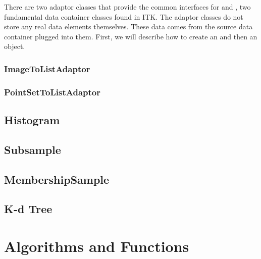 There are two adaptor classes that provide the common
 interfaces for  and
, two fundamental data container classes found in ITK. The
adaptor classes do not store any real data elements themselves. These data
comes from the source data container plugged into them. First, we will
describe how to create an
 and then an
 object.

\subsubsection{ImageToListAdaptor}
\label{sec:ImageToListAdaptor}



\subsubsection{PointSetToListAdaptor}
\label{sec:PointSetToListAdaptor}



\subsection{Histogram}
\label{sec:Histogram}



\subsection{Subsample}
\label{sec:Subsample}



\subsection{MembershipSample}
\label{sec:MembershipSample}



\subsection{K-d Tree}
\label{sec:KdTree}



\section{Algorithms and Functions}
\label{sec:StatisticsAlgorithmsFunctions}

